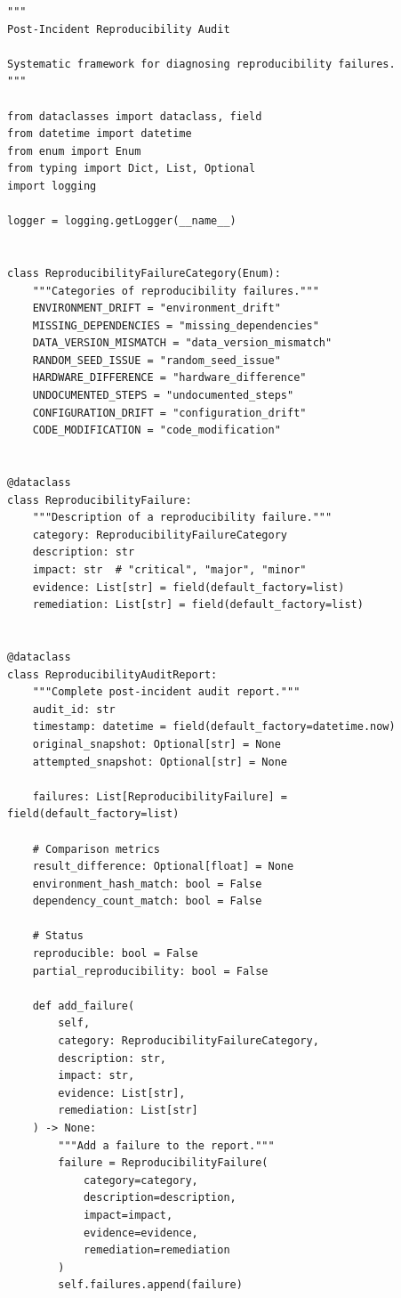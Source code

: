 \begin{lstlisting}[style=python, caption={Post-incident reproducibility audit framework}]
"""
Post-Incident Reproducibility Audit

Systematic framework for diagnosing reproducibility failures.
"""

from dataclasses import dataclass, field
from datetime import datetime
from enum import Enum
from typing import Dict, List, Optional
import logging

logger = logging.getLogger(__name__)


class ReproducibilityFailureCategory(Enum):
    """Categories of reproducibility failures."""
    ENVIRONMENT_DRIFT = "environment_drift"
    MISSING_DEPENDENCIES = "missing_dependencies"
    DATA_VERSION_MISMATCH = "data_version_mismatch"
    RANDOM_SEED_ISSUE = "random_seed_issue"
    HARDWARE_DIFFERENCE = "hardware_difference"
    UNDOCUMENTED_STEPS = "undocumented_steps"
    CONFIGURATION_DRIFT = "configuration_drift"
    CODE_MODIFICATION = "code_modification"


@dataclass
class ReproducibilityFailure:
    """Description of a reproducibility failure."""
    category: ReproducibilityFailureCategory
    description: str
    impact: str  # "critical", "major", "minor"
    evidence: List[str] = field(default_factory=list)
    remediation: List[str] = field(default_factory=list)


@dataclass
class ReproducibilityAuditReport:
    """Complete post-incident audit report."""
    audit_id: str
    timestamp: datetime = field(default_factory=datetime.now)
    original_snapshot: Optional[str] = None
    attempted_snapshot: Optional[str] = None

    failures: List[ReproducibilityFailure] = field(default_factory=list)

    # Comparison metrics
    result_difference: Optional[float] = None
    environment_hash_match: bool = False
    dependency_count_match: bool = False

    # Status
    reproducible: bool = False
    partial_reproducibility: bool = False

    def add_failure(
        self,
        category: ReproducibilityFailureCategory,
        description: str,
        impact: str,
        evidence: List[str],
        remediation: List[str]
    ) -> None:
        """Add a failure to the report."""
        failure = ReproducibilityFailure(
            category=category,
            description=description,
            impact=impact,
            evidence=evidence,
            remediation=remediation
        )
        self.failures.append(failure)


\end{lstlisting}
